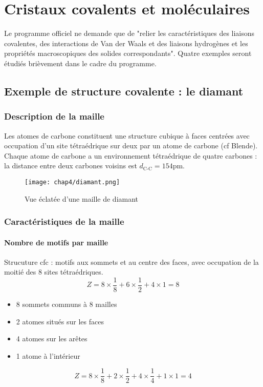 \chapter{Cristaux covalents et moléculaires}
Le programme officiel ne demande que de "relier les caractéristiques des liaisons
covalentes, des interactions de Van der Waals et des liaisons hydrogènes et les
propriétés macroscopiques des solides correspondants". Quatre exemples seront étudiés
brièvement dans le cadre du programme.

\section{Exemple de structure covalente : le diamant }
\subsection{Description de la maille}
Les atomes de carbone constituent une structure cubique à faces centrées avec
occupation d’un site tétraédrique sur deux par un atome de carbone (cf Blende). Chaque
atome de carbone a un environnement tétraédrique de quatre carbones : la distance
entre deux carbones voisins est $d_\text{C-C} = 154$pm.

\begin{figure}
    \centering
    \texttt{[image: chap4/diamant.png]}
    \caption{Vue éclatée d'une maille de diamant}\label{fig:4_diamant_eclatee}
\end{figure}

\subsection{Caractéristiques de la maille}
\subsubsection{Nombre de motifs par maille}
Strucuture cfc : motifs aux sommets et au centre des faces, avec occupation de la
moitié des 8 sites tétraédriques.
\begin{equation}
    Z = 8 \times \frac{1}{8} + 6 \times \frac{1}{2} + 4 \times 1 = 8
\end{equation}


\begin{itemize}
    \item 8 sommets communs à 8 mailles
    \item 2 atomes situés sur les faces
    \item 4 atomes sur les arêtes
    \item 1 atome à l'intérieur
\end{itemize}
\begin{equation}
    Z = 8 \times \frac{1}{8} + 2 \times \frac{1}{2} + 4 \times
    \frac{1}{4} + 1 \times 1 = 4
\end{equation}
